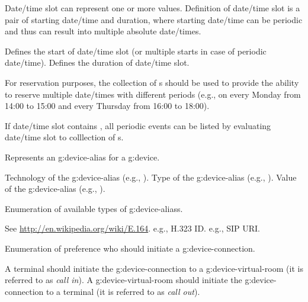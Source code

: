 \begin{Api}
Date/time slot can represent one or more  values. Definition of date/time slot is a pair of starting date/time and duration, where starting date/time can be periodic and thus can result into multiple absolute date/times.
\begin{ApiClassAttributes}
Defines the start of date/time slot (or multiple starts in case of periodic date/time).
Defines the duration of date/time slot.
\end{ApiClassAttributes}

For reservation purposes, the collection of s should be used to provide the ability to reserve multiple date/times with different periods (e.g., on every Monday from 14:00 to 15:00 and every Thursday from 16:00 to 18:00).

If date/time slot contains , all periodic events can be listed by evaluating date/time slot to colllection of s.

Represents an \gls{g:device-alias} for a \gls{g:device}.
\begin{ApiClassAttributes}
 Technology of the \gls{g:device-alias} (e.g., ).
 Type of the \gls{g:device-alias} (e.g., ).
 Value of the \gls{g:device-alias} (e.g., ).
\end{ApiClassAttributes}

Enumeration of available types of \glspl{g:device-alias}.
\begin{ApiEnumValues}
 See \url{http://en.wikipedia.org/wiki/E.164}.
 e.g., H.323 ID.
 e.g., SIP URI.
\end{ApiEnumValues}

Enumeration of preference who should initiate a \gls{g:device-connection}.
\begin{ApiEnumValues}
 A terminal should initiate the \gls{g:device-connection} to a \gls{g:device-virtual-room} (it is referred to as \emph{call in}).
 A \gls{g:device-virtual-room} should initiate the \gls{g:device-connection} to a terminal (it is referred to as \emph{call out}).
\end{ApiEnumValues}


\end{Api}
